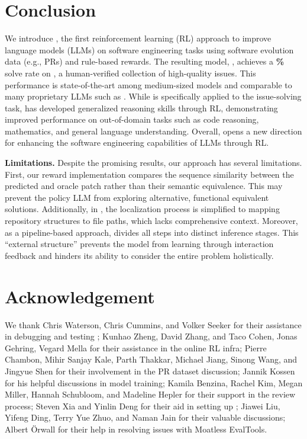 \section{Conclusion}
\label{section:conclusion}


We introduce \tech, the first reinforcement learning (RL) approach to improve language models (LLMs) on software engineering tasks using software evolution data (e.g., PRs) and rule-based rewards.
The resulting model, \ours[70], achieves a \textbf{\swebfinalbig{}\%} solve rate on \swebverified, a human-verified collection of high-quality \github issues.
This performance is state-of-the-art among medium-sized models and comparable to many proprietary LLMs such as .
While \tech is specifically applied to the issue-solving task, \ours has developed generalized reasoning skills through RL, demonstrating improved performance on out-of-domain tasks such as code reasoning, mathematics, and general language understanding.
Overall, \tech opens a new direction for enhancing the software engineering capabilities of LLMs through RL.

\textbf{Limitations.}
Despite the promising results, our approach has several limitations.
First, our reward implementation compares the sequence similarity between the predicted and oracle patch rather than their semantic equivalence. This may prevent the policy LLM from exploring alternative, functional equivalent solutions.
Additionally, in \ouragentless, the localization process is simplified to mapping repository structures to file paths, which lacks comprehensive context.
Moreover, as a pipeline-based approach, \ouragentless divides all steps into distinct inference stages. This ``external structure'' prevents the model from learning through interaction feedback and hinders its ability to consider the entire problem holistically.







\section*{Acknowledgement}

We thank Chris Waterson, Chris Cummins, and Volker Seeker for their assistance in debugging and testing \ouragentless;
Kunhao Zheng, David Zhang, and Taco Cohen, Jonas Gehring, Vegard Mella for their assistance in the online RL infra;
Pierre Chambon, Mihir Sanjay Kale, Parth Thakkar, Michael Jiang, Sinong Wang, and Jingyue Shen for their involvement in the PR dataset discussion;
Jannik Kossen for his helpful discussions in model training;
Kamila Benzina, Rachel Kim, Megan Miller, Hannah Schubloom, and Madeline Hepler for their support in the review process;
Steven Xia and Yinlin Deng for their aid in setting up \agentless;
Jiawei Liu, Yifeng Ding, Terry Yue Zhuo, and Naman Jain for their valuable discussions;
Albert Örwall for their help in resolving issues with Moatless EvalTools.

